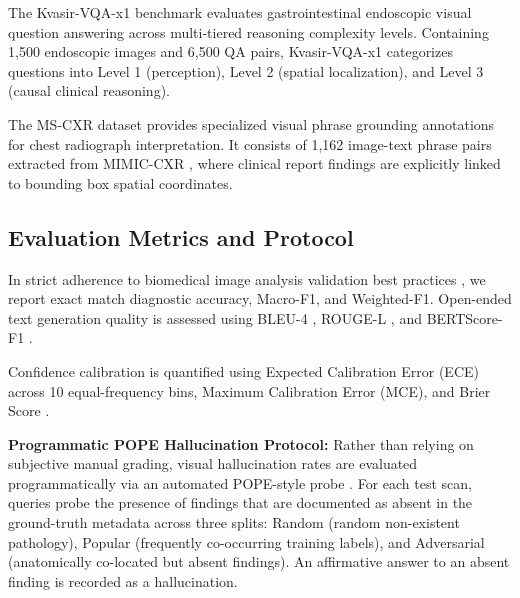 \documentclass[journal,twoside,web]{ieeecolor}
\begin{document}
The Kvasir-VQA-x1 benchmark \cite{jha2023} evaluates gastrointestinal endoscopic visual question answering across multi-tiered reasoning complexity levels. Containing 1,500 endoscopic images and 6,500 QA pairs, Kvasir-VQA-x1 categorizes questions into Level 1 (perception), Level 2 (spatial localization), and Level 3 (causal clinical reasoning).

The MS-CXR dataset \cite{boecking2022} provides specialized visual phrase grounding annotations for chest radiograph interpretation. It consists of 1,162 image-text phrase pairs extracted from MIMIC-CXR \cite{johnson2019mimic}, where clinical report findings are explicitly linked to bounding box spatial coordinates.

\subsection{Evaluation Metrics and Protocol}
In strict adherence to biomedical image analysis validation best practices \cite[Sec.~3, p.~198]{maier2024}, we report exact match diagnostic accuracy, Macro-F1, and Weighted-F1. Open-ended text generation quality is assessed using BLEU-4 \cite{papineni2002bleu}, ROUGE-L \cite{lin2004rouge}, and BERTScore-F1 \cite{zhang2019bertscore}.

Confidence calibration is quantified using Expected Calibration Error (ECE) \cite{guo2017} across 10 equal-frequency bins, Maximum Calibration Error (MCE), and Brier Score \cite{brier1950}. 

\noindent\textbf{Programmatic POPE Hallucination Protocol:} Rather than relying on subjective manual grading, visual hallucination rates are evaluated programmatically via an automated POPE-style probe \cite{li2023pope}. For each test scan, queries probe the presence of findings that are documented as absent in the ground-truth metadata across three splits: Random (random non-existent pathology), Popular (frequently co-occurring training labels), and Adversarial (anatomically co-located but absent findings). An affirmative answer to an absent finding is recorded as a hallucination.
\end{document}
